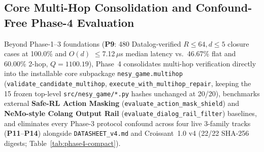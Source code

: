 \subsection{Core Multi-Hop Consolidation and Confound-Free Phase-4 Evaluation}\label{sec:phase4-compact}
Beyond Phase-1--3 foundations (\textbf{P9}: 480 Datalog-verified $R{\le}64, d{\le}5$ closure cases at 100.0\% and $O(d)$ $\le$7.12\,$\mu$s median latency vs.\ 46.67\% flat and 60.00\% 2-hop, $Q{=}1100.19$), Phase~4 consolidates multi-hop verification directly into the installable core subpackage \texttt{nesy\_\allowbreak game.\allowbreak multihop} (\texttt{validate\_\allowbreak candidate\_\allowbreak multihop}, \texttt{execute\_\allowbreak with\_\allowbreak multihop\_\allowbreak repair}, keeping the 15 frozen top-level \texttt{src/\allowbreak nesy\_\allowbreak game/*.py} hashes unchanged at 20/20), benchmarks external \textbf{Safe-RL Action Masking} (\texttt{evaluate\_\allowbreak action\_\allowbreak mask\_\allowbreak shield}) and \textbf{NeMo-style Colang Output Rail} (\texttt{evaluate\_\allowbreak dialog\_\allowbreak rail\_\allowbreak filter}) baselines, and eliminates every Phase-3 protocol confound across four live 3-family tracks (\textbf{P11}--\textbf{P14}) alongside \texttt{DATASHEET\_v4.md} and Croissant~1.0 v4 (22/22 SHA-256 digests; Table~\ref{tab:phase4-compact}).

